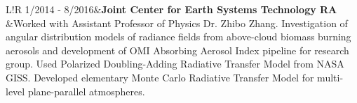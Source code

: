 \documentclass[10pt]{article}
\newcommand\VRule{\color{black}\vrule width 0.5pt}
\begin{document}
\begin {longtable}{L!{\VRule}R}
1/2014 - 8/2016&{\bf Joint Center for Earth Systems Technology RA}\\
&{Worked with Assistant Professor of Physics Dr. Zhibo Zhang. Investigation of angular distribution models of radiance fields from above-cloud biomass burning aerosols and development of OMI Absorbing Aerosol Index pipeline for research group. Used Polarized Doubling-Adding Radiative Transfer Model from NASA GISS. Developed elementary Monte Carlo Radiative Transfer Model for multi-level plane-parallel atmospheres.}\\[5pt]
\end{longtable}
\vspace{-10pt}

\newpage
\end{document}
